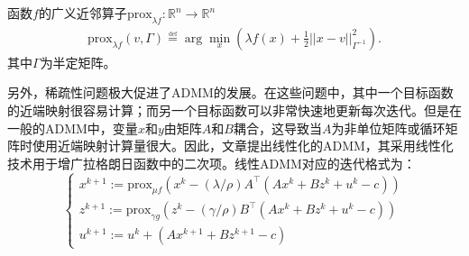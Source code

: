 \begin{definition} \label{def:2-5}
	函数$f$的广义近邻算子$\text{prox}_{\lambda{f}}:\mathbb{R}^n\to\mathbb{R}^n$
	\begin{equation}\label{generalized-proximal-operator}
		\begin{aligned}
			\text{prox}_{\lambda f}(v,\Gamma)\overset{\underset{\mathrm{def}}{}}{=}\arg\min_{x}\left({\lambda f(x)+\frac{1}{2}||x-v||_{\Gamma^{-1}}^2}\right).
		\end{aligned}
	\end{equation}
	其中$\Gamma$为半定矩阵。
\end{definition}

另外，稀疏性问题极大促进了ADMM的发展。在这些问题中，其中一个目标函数的近端映射很容易计算；而另一个目标函数可以非常快速地更新每次迭代。但是在一般的ADMM中，变量$x$和$y$由矩阵$A$和$B$耦合，这导致当$A$为非单位矩阵或循环矩阵时使用近端映射计算量很大。因此，文章提出线性化的ADMM，其采用线性化技术用于增广拉格朗日函数中的二次项。线性ADMM对应的迭代格式为：
\begin{equation}\label{method:2-8}
	\begin{cases}
		x^{k+1}:=\text{prox}_{\mu{f}}(x^k−(\lambda/\rho)A^\top(Ax^k+Bz^k+u^k-c)) \\
		z^{k+1}:=\text{prox}_{\gamma{g}}(z^k−(\gamma/\rho)B^\top(Ax^k +Bz^k+u^k-c)) \\
		u^{k+1}:=u^k+(Ax^{k+1}+Bz^{k+1}-c)
	\end{cases}
\end{equation}

